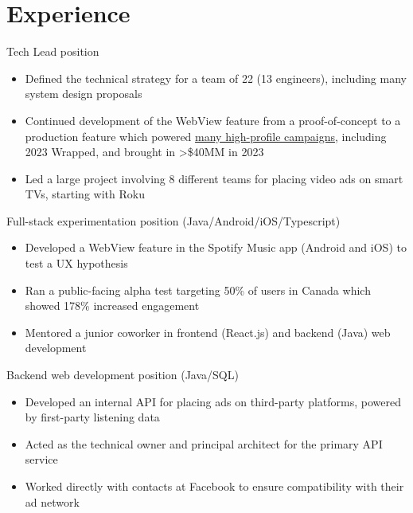 



\makecvtitle


\section{Experience}
	{Tech Lead position}{
	\begin{itemize}
	\item Defined the technical strategy for a team of 22 (13 engineers), including many system design proposals
	\item Continued development of the WebView feature from a proof-of-concept to a production feature which powered \textcolor{color1}{\href{https://newsroom.spotify.com/2023-10-18/spotifys-interactive-experiences-create-the-magic-of-wrapped-year-round/}{many high-profile campaigns}}, including 2023 Wrapped, and brought in >\$40MM in 2023
	\item Led a large project involving 8 different teams for placing video ads on smart TVs, starting with Roku
	\end{itemize}
	}
	{Full-stack experimentation position (Java/Android/iOS/Typescript)}{
	\begin{itemize}
	\item Developed a WebView feature in the Spotify Music app (Android and iOS) to test a UX hypothesis
	\item Ran a public-facing alpha test targeting 50\% of users in Canada which showed 178\% increased engagement
	\item Mentored a junior coworker in frontend (React.js) and backend (Java) web development
	\end{itemize}
	}
	{Backend web development position (Java/SQL)}{
	\begin{itemize}
	\item Developed an internal API for placing ads on third-party platforms, powered by first-party listening data
	\item Acted as the technical owner and principal architect for the primary API service
	\item Worked directly with contacts at Facebook to ensure compatibility with their ad network
	\end{itemize}
}

